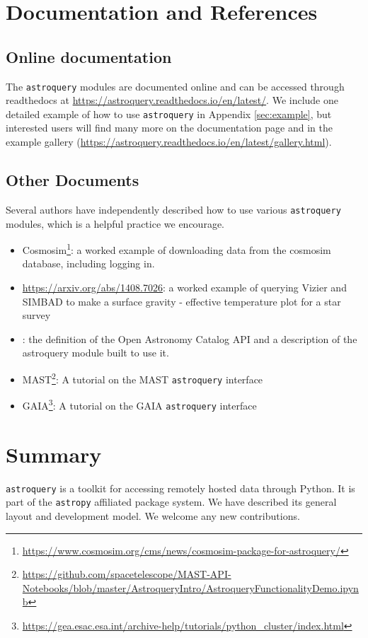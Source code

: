 \documentclass[twocolumn]{aastex62}
\newcommand{\package}[1]{\texttt{#1}\xspace}
\newcommand{\astroquery}{\package{astroquery}}
\newcommand{\astropypkg}{\package{astropy}}
\begin{document}
\section{Documentation and References}
\label{sec:documentation}
\subsection{Online documentation}
The \astroquery modules are documented online and can be accessed through
readthedocs at \url{https://astroquery.readthedocs.io/en/latest/}.
We include one detailed example of how to use \astroquery in Appendix \ref{sec:example},
but interested users will find many more on the documentation page and
in the example gallery (\url{https://astroquery.readthedocs.io/en/latest/gallery.html}).

\subsection{Other Documents}
Several authors have independently described how to use various \astroquery
modules, which is a helpful practice we encourage.
 \begin{itemize}
    \item
        Cosmosim\footnote{\url{https://www.cosmosim.org/cms/news/cosmosim-package-for-astroquery/}}:
        a worked example of downloading data from the cosmosim database,
        including logging in.
    \item \url{https://arxiv.org/abs/1408.7026}: a worked example of querying
        Vizier and SIMBAD to make a surface gravity - effective temperature
        plot for a star survey
    \item \citet{Guillochon2018a}: the definition of
        the Open Astronomy Catalog API and a description of the astroquery
        module built to use it.
    \item
        MAST\footnote{\url{https://github.com/spacetelescope/MAST-API-Notebooks/blob/master/AstroqueryIntro/AstroqueryFunctionalityDemo.ipynb}}:
        A tutorial on the MAST \astroquery interface
    \item GAIA\footnote{\url{https://gea.esac.esa.int/archive-help/tutorials/python_cluster/index.html}}:
        A tutorial on the GAIA \astroquery interface
\end{itemize}


\section{Summary}
\astroquery is a toolkit for accessing remotely hosted data through Python.
It is part of the \astropypkg affiliated package system.
We have described its general layout and development model.
We welcome any new contributions.
\end{document}

